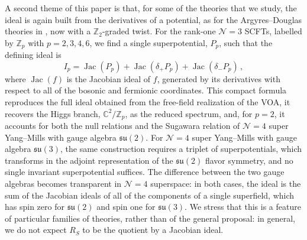 \documentclass[12pt]{article}
\numberwithin{equation}{section}
\numberwithin{figure}{section}
\theoremstyle{plain}
\theoremstyle{definition}
\begin{document}
A second theme of this paper is that, for some of the theories that we study, the ideal is again built from the derivatives of a potential, as for the Argyres--Douglas theories in \cite{Kang:2026nge,Kang:2026ona,Kang:2026ney,Kang:2026jnv}, now with a $\mathbb{Z}_2$-graded twist. For the rank-one $\mathcal{N}=3$ SCFTs, labelled by $\mathbb{Z}_p$ with $p = 2, 3, 4, 6$, we find a single superpotential, $P_p$, such that the defining ideal is
\begin{equation}
    I_p = \operatorname{Jac}(P_p) + \operatorname{Jac}(\delta_+ P_p) + \operatorname{Jac}(\delta_- P_p) \,,
\end{equation}
where $\operatorname{Jac}(f)$ is the Jacobian ideal of $f$, generated by its derivatives with respect to all of the bosonic and fermionic coordinates. This compact formula reproduces the full ideal obtained from the free-field realization of the VOA, it recovers the Higgs branch, $\mathbb{C}^2/\mathbb{Z}_p$, as the reduced spectrum, and, for $p = 2$, it accounts for both the null relations and the Sugawara relation of $\mathcal{N}=4$ super Yang--Mills with gauge algebra $\mathfrak{su}(2)$. For $\mathcal{N}=4$ super Yang--Mills with gauge algebra $\mathfrak{su}(3)$, the same construction requires a triplet of superpotentials, which transforms in the adjoint representation of the $\mathfrak{su}(2)$ flavor symmetry, and no single invariant superpotential suffices. The difference between the two gauge algebras becomes transparent in $\mathcal{N}=4$ superspace: in both cases, the ideal is the sum of the Jacobian ideals of all of the components of a single superfield, which has spin zero for $\mathfrak{su}(2)$ and spin one for $\mathfrak{su}(3)$. We stress that this is a feature of particular families of theories, rather than of the general proposal: in general, we do not expect $R_S$ to be the quotient by a Jacobian ideal.
\end{document}
